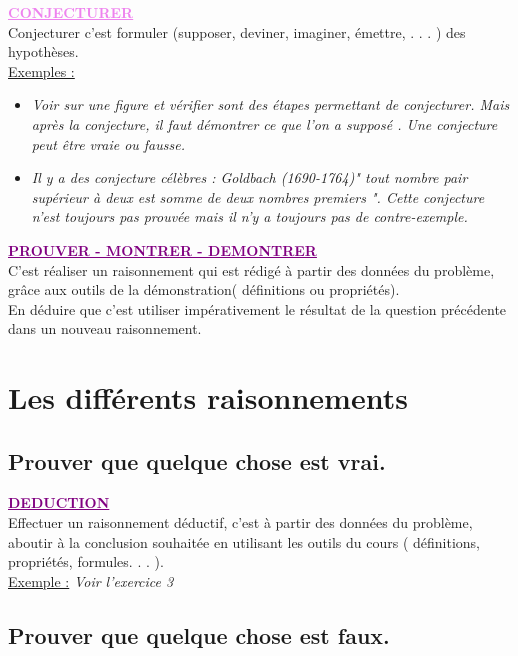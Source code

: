 \documentclass[a4paper,11pt]{article}
\newcommand{\bi}{\begin{itemize}}
\newcommand{\ei}{\end{itemize}}
\begin{document}
\textbf{\textcolor{violet}{\underline{CONJECTURER}}}\\
Conjecturer c'est formuler (supposer, deviner, imaginer, émettre, . . . ) des hypothèses.\\

\underline{Exemples :}
\bi
\item \textit{Voir sur une figure et vérifier sont des étapes permettant de conjecturer. Mais après la conjecture, il faut démontrer ce que l'on a supposé . Une conjecture peut être vraie ou fausse.}
\item  \textit{Il y a des conjecture célèbres : Goldbach (1690-1764)" tout nombre pair supérieur à deux est somme de deux nombres premiers ". Cette conjecture n'est toujours pas prouvée mais il n'y a toujours pas
de contre-exemple.}\\
\ei

\vspace*{0.5cm}


\textbf{\textcolor{purple}{\underline{PROUVER - MONTRER - DEMONTRER}}}\\
C'est réaliser un raisonnement qui est rédigé à partir des données du problème, grâce aux outils de la démonstration( définitions ou propriétés).\\
En déduire que c'est utiliser impérativement le résultat de la question précédente dans un nouveau raisonnement.\\


\section{Les différents raisonnements}

\subsection{Prouver que quelque chose est vrai.}

\textbf{\textcolor{purple}{\underline{DEDUCTION}}}\\
Effectuer un raisonnement déductif, c'est à partir des données du problème, aboutir à la conclusion souhaitée en utilisant les outils du cours ( définitions, propriétés, formules. . . ).\\

\underline{Exemple :} \textit{Voir l'exercice 3}




\subsection{Prouver que quelque chose est faux.}
\end{document}
